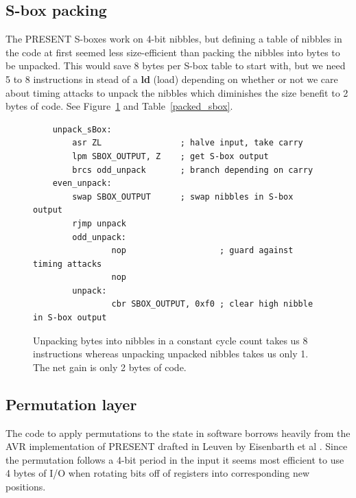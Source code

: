 \documentclass[11pt]{article}
\begin{document}
\subsection{S-box packing}\label{sbox_packing}
The PRESENT S-boxes work on 4-bit nibbles, but defining a table of nibbles in the code at first seemed less size-efficient than packing the nibbles into bytes to be unpacked.
This would save 8 bytes per S-box table to start with, but we need 5 to 8 instructions in stead of a \textbf{ld} (load) depending on whether or not we care about timing attacks to unpack the nibbles which diminishes the size benefit to 2 bytes of code. See Figure~\ref{unpacking_code} and Table~\ref{packed_sbox}.

\begin{figure}
\begin{lstlisting}
	unpack_sBox:
		asr ZL                ; halve input, take carry
		lpm SBOX_OUTPUT, Z    ; get S-box output
		brcs odd_unpack       ; branch depending on carry
	even_unpack:
		swap SBOX_OUTPUT      ; swap nibbles in S-box output
		rjmp unpack
        odd_unpack:
                nop                   ; guard against timing attacks
                nop
        unpack:
                cbr SBOX_OUTPUT, 0xf0 ; clear high nibble in S-box output
	\end{lstlisting}
	\caption{Unpacking bytes into nibbles in a constant cycle count takes us 8 instructions whereas unpacking unpacked nibbles takes us only 1. The net gain is only 2 bytes of code.}
\label{unpacking_code}
\end{figure}



\subsection{Permutation layer}
The code to apply permutations to the state in software borrows heavily from the AVR implementation of PRESENT drafted in Leuven by Eisenbarth et al \cite{eisenbarth2012compact}.
Since the permutation follows a 4-bit period in the input it seems most efficient to use 4 bytes of I/O when rotating bits off of registers into corresponding new positions.
\end{document}
